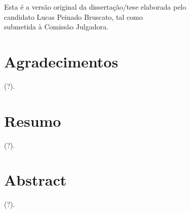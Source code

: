 \documentclass[12pt,twoside,a4paper]{book}
\begin{document}
\vskip 2cm

\begin{flushright}
    Esta é a versão original da dissertação/tese elaborada pelo\\
    candidato Lucas Peinado Bruscato, tal como\\
    submetida à Comissão Julgadora.
    
    \vskip 2cm

\end{flushright}

\vskip 4.2cm

\chapter*{Agradecimentos}

(?).


\chapter*{Resumo}

(?).

\chapter*{Abstract}

(?).

\tableofcontents    %

\listoffigures            
\listoftables            

\mainmatter

\fancyhead[RE,LO]{\thesection}

\singlespacing              %
\end{document}
